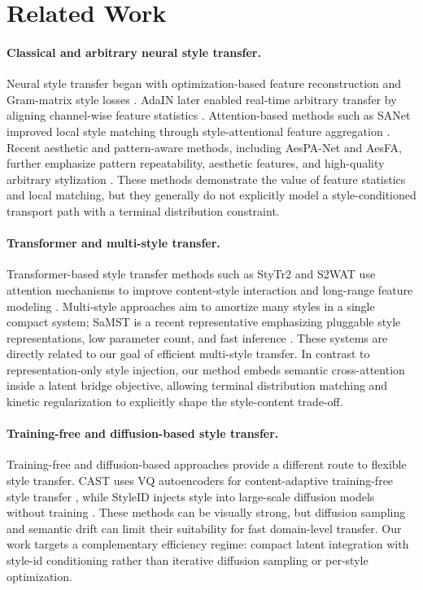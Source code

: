 \documentclass{article}
\begin{document}
\section{Related Work}
\paragraph{Classical and arbitrary neural style transfer.}
Neural style transfer began with optimization-based feature reconstruction and Gram-matrix style losses \cite{gatys2016image}. AdaIN later enabled real-time arbitrary transfer by aligning channel-wise feature statistics \cite{huang2017adain}. Attention-based methods such as SANet improved local style matching through style-attentional feature aggregation \cite{park2019sanet}. Recent aesthetic and pattern-aware methods, including AesPA-Net and AesFA, further emphasize pattern repeatability, aesthetic features, and high-quality arbitrary stylization \cite{hong2023aespa,huang2024aesfa}. These methods demonstrate the value of feature statistics and local matching, but they generally do not explicitly model a style-conditioned transport path with a terminal distribution constraint.

\paragraph{Transformer and multi-style transfer.}
Transformer-based style transfer methods such as StyTr2 and S2WAT use attention mechanisms to improve content-style interaction and long-range feature modeling \cite{deng2022stytr2,xia2024s2wat}. Multi-style approaches aim to amortize many styles in a single compact system; SaMST is a recent representative emphasizing pluggable style representations, low parameter count, and fast inference \cite{liu2024samst}. These systems are directly related to our goal of efficient multi-style transfer. In contrast to representation-only style injection, our method embeds semantic cross-attention inside a latent bridge objective, allowing terminal distribution matching and kinetic regularization to explicitly shape the style-content trade-off.

\paragraph{Training-free and diffusion-based style transfer.}
Training-free and diffusion-based approaches provide a different route to flexible style transfer. CAST uses VQ autoencoders for content-adaptive training-free style transfer \cite{gim2024cast}, while StyleID injects style into large-scale diffusion models without training \cite{chung2024styleid}. These methods can be visually strong, but diffusion sampling and semantic drift can limit their suitability for fast domain-level transfer. Our work targets a complementary efficiency regime: compact latent integration with style-id conditioning rather than iterative diffusion sampling or per-style optimization.
\end{document}
